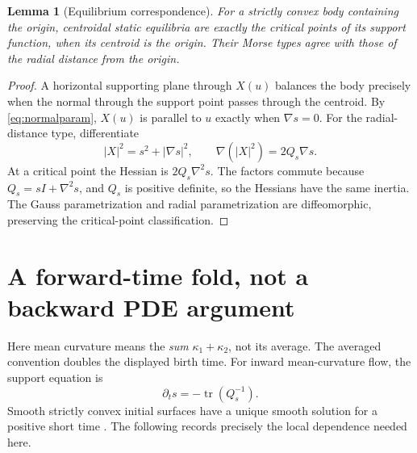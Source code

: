 \documentclass[11pt,a4paper]{article}
\newtheorem{lemma}[theorem]{Lemma}
\theoremstyle{remark}\newtheorem{remark}[theorem]{Remark}
\DeclareMathOperator{\tr}{tr}\DeclareMathOperator{\sgn}{sgn}\DeclareMathOperator{\Cov}{Cov}
\begin{document}
\begin{lemma}[Equilibrium correspondence]\label{lem:equilibria}
For a strictly convex body containing the origin, centroidal static equilibria are exactly the critical points of its support function, when its centroid is the origin. Their Morse types agree with those of the radial distance from the origin.
\end{lemma}
\begin{proof}
A horizontal supporting plane through \(X(u)\) balances the body precisely when the normal through the support point passes through the centroid. By \eqref{eq:normalparam}, \(X(u)\) is parallel to \(u\) exactly when \(\nabla s=0\). For the radial-distance type, differentiate
\[
 |X|^2=s^2+|\nabla s|^2,
 \qquad \nabla(|X|^2)=2Q_s\nabla s.
\]
At a critical point the Hessian is \(2Q_s\nabla^2s\). The factors commute because \(Q_s=sI+\nabla^2s\), and \(Q_s\) is positive definite, so the Hessians have the same inertia. The Gauss parametrization and radial parametrization are diffeomorphic, preserving the critical-point classification.
\end{proof}

\section{A forward-time fold, not a backward PDE argument}\label{sec:fold}
Here mean curvature means the \emph{sum} $\kappa_1+\kappa_2$, not its average. The averaged convention doubles the displayed birth time. For inward mean-curvature flow, the support equation is
\begin{equation}\label{eq:mcf}
 \partial_t s=-\tr(Q_s^{-1}).
\end{equation}
Smooth strictly convex initial surfaces have a unique smooth solution for a positive short time \citep{H84}. The following records precisely the local dependence needed here.
\end{document}
